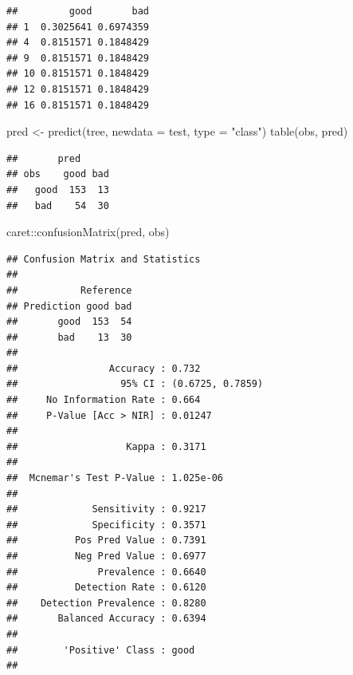 \documentclass[
  spanish,
]{book}
\newenvironment{Shaded}{\begin{snugshade}}{\end{snugshade}}
\newcommand{\AttributeTok}[1]{\textcolor[rgb]{0.77,0.63,0.00}{#1}}
\newcommand{\FunctionTok}[1]{\textcolor[rgb]{0.00,0.00,0.00}{#1}}
\newcommand{\NormalTok}[1]{#1}
\newcommand{\OtherTok}[1]{\textcolor[rgb]{0.56,0.35,0.01}{#1}}
\newcommand{\SpecialCharTok}[1]{\textcolor[rgb]{0.00,0.00,0.00}{#1}}
\newcommand{\StringTok}[1]{\textcolor[rgb]{0.31,0.60,0.02}{#1}}
\theoremstyle{break}
\theoremstyle{definition}
\theoremstyle{definition}
\theoremstyle{definition}
\theoremstyle{definition}
\theoremstyle{remark}
\begin{document}
\begin{verbatim}
##         good       bad
## 1  0.3025641 0.6974359
## 4  0.8151571 0.1848429
## 9  0.8151571 0.1848429
## 10 0.8151571 0.1848429
## 12 0.8151571 0.1848429
## 16 0.8151571 0.1848429
\end{verbatim}

\begin{Shaded}
\begin{Highlighting}[]
\NormalTok{pred }\OtherTok{\textless{}{-}} \FunctionTok{predict}\NormalTok{(tree, }\AttributeTok{newdata =}\NormalTok{ test, }\AttributeTok{type =} \StringTok{"class"}\NormalTok{)}
\FunctionTok{table}\NormalTok{(obs, pred)}
\end{Highlighting}
\end{Shaded}

\begin{verbatim}
##       pred
## obs    good bad
##   good  153  13
##   bad    54  30
\end{verbatim}

\begin{Shaded}
\begin{Highlighting}[]
\NormalTok{caret}\SpecialCharTok{::}\FunctionTok{confusionMatrix}\NormalTok{(pred, obs)}
\end{Highlighting}
\end{Shaded}

\begin{verbatim}
## Confusion Matrix and Statistics
## 
##           Reference
## Prediction good bad
##       good  153  54
##       bad    13  30
##                                           
##                Accuracy : 0.732           
##                  95% CI : (0.6725, 0.7859)
##     No Information Rate : 0.664           
##     P-Value [Acc > NIR] : 0.01247         
##                                           
##                   Kappa : 0.3171          
##                                           
##  Mcnemar's Test P-Value : 1.025e-06       
##                                           
##             Sensitivity : 0.9217          
##             Specificity : 0.3571          
##          Pos Pred Value : 0.7391          
##          Neg Pred Value : 0.6977          
##              Prevalence : 0.6640          
##          Detection Rate : 0.6120          
##    Detection Prevalence : 0.8280          
##       Balanced Accuracy : 0.6394          
##                                           
##        'Positive' Class : good            
## 
\end{verbatim}
\end{document}
